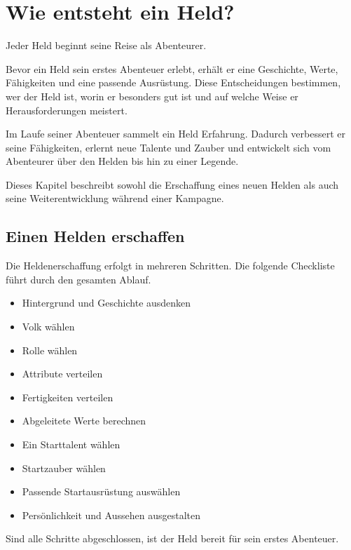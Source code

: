 \chapter{Wie entsteht ein Held?}
\label{chap:hero-creation}

Jeder Held beginnt seine Reise als Abenteurer.

Bevor ein Held sein erstes Abenteuer erlebt, erhält er eine Geschichte, Werte, Fähigkeiten und eine passende Ausrüstung. Diese Entscheidungen bestimmen, wer der Held ist, worin er besonders gut ist und auf welche Weise er Herausforderungen meistert.

Im Laufe seiner Abenteuer sammelt ein Held Erfahrung. Dadurch verbessert er seine Fähigkeiten, erlernt neue Talente und Zauber und entwickelt sich vom Abenteurer über den Helden bis hin zu einer Legende.

Dieses Kapitel beschreibt sowohl die Erschaffung eines neuen Helden als auch seine Weiterentwicklung während einer Kampagne.

\section{Einen Helden erschaffen}

Die Heldenerschaffung erfolgt in mehreren Schritten. Die folgende Checkliste führt durch den gesamten Ablauf.

\begin{kurzregel}[title=Checkliste: Einen Helden erschaffen]
\begin{itemize}[label=$\square$]
  \item Hintergrund und Geschichte ausdenken
  \item Volk wählen
  \item Rolle wählen
  \item Attribute verteilen
  \item Fertigkeiten verteilen
  \item Abgeleitete Werte berechnen
  \item Ein Starttalent wählen
  \item Startzauber wählen
  \item Passende Startausrüstung auswählen
  \item Persönlichkeit und Aussehen ausgestalten
\end{itemize}
\end{kurzregel}

Sind alle Schritte abgeschlossen, ist der Held bereit für sein erstes Abenteuer.

